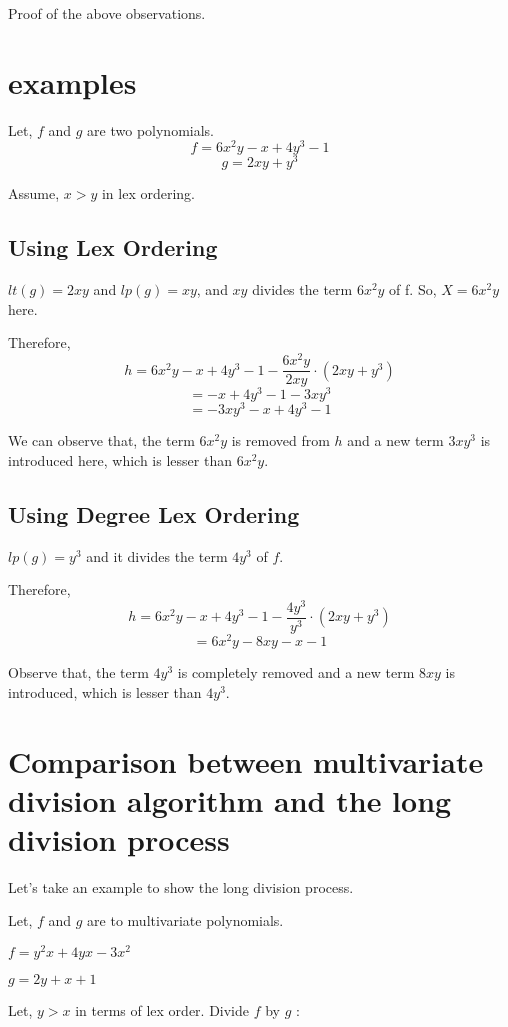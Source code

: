 \begin{exercise} Proof of the above observations.
\end{exercise}

\section{examples}
Let, $f$ and $g$ are two polynomials.
$$ f = 6x^2y - x + 4y^3 -1$$
$$ g = 2xy + y^3$$

Assume, $x>y$ in lex ordering.

\subsection{Using Lex Ordering}
$lt(g) = 2xy$ and $lp(g) = xy$, and $xy$ divides the term $6x^2y$ of f. So, $ X = 6x^2y$ here.

Therefore, $$ h = 6x^2y - x + 4y^3 -1 - \frac{6x^2y}{2xy}\cdot {(2xy + y^3)}$$
$$ = -x + 4y^3 -1 -3xy^3$$
$$ = -3xy^3 - x + 4y^3 - 1$$

We can observe that, the term $6x^2y$ is removed from $h$ and a new term $3xy^3$ is introduced here, which is lesser than $6x^2y$.

\subsection{Using Degree Lex Ordering}
$lp(g) = y^3$ and it divides the term $4y^3$ of $f$.

Therefore, $$ h = 6x^2y - x + 4y^3 -1 - \frac{4y^3}{y^3}\cdot {(2xy + y^3)}$$
$$= 6x^2y - 8xy -x -1$$

Observe that, the term $4y^3$ is completely removed and a new term $8xy$ is introduced, which is lesser than $4y^3$.

\section{Comparison between multivariate division algorithm and the long division process}

Let's take an example to show the long division process.

Let, $f$ and $g$ are to multivariate polynomials.
 
$ f = y^2x + 4yx - 3x^2$

$ g = 2y + x + 1$

Let, $y>x$ in terms of lex order. Divide $f$ by $g$ :

\newcommand{\ldsym}{$\left.\mathstrut\right)$}%
\newlength{\ldwidth}
\newcommand{\longdivide}[2]%
{\settowidth{\ldwidth}{\ldsym}
#1\,\raisebox{1.5pt}{\ldsym}\hspace*{-.65\ldwidth}\overline{
\mathstrut\hspace*{.35\ldwidth}\ #2}}

